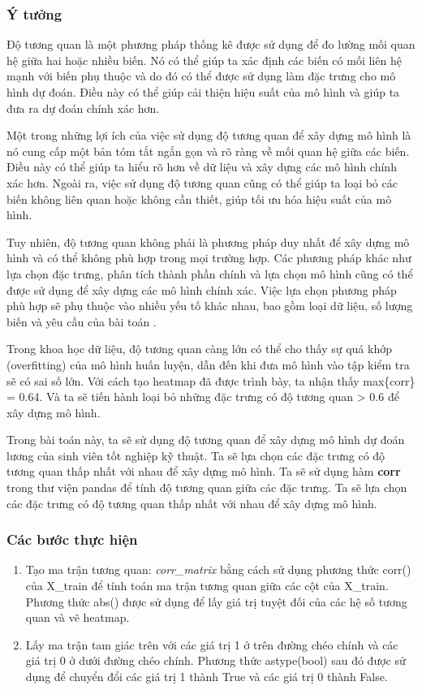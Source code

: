 \documentclass[]{article}
\begin{document}
\begin{itemize}
  \subsubsection{Ý tưởng}
  Độ tương quan là một phương pháp thống kê được sử dụng để đo lường mối quan hệ giữa hai hoặc nhiều biến. Nó có thể giúp ta xác định các biến có mối liên hệ mạnh với biến phụ thuộc và do đó có thể được sử dụng làm đặc trưng cho mô hình dự đoán. Điều này có thể giúp cải thiện hiệu suất của mô hình và giúp ta đưa ra dự đoán chính xác hơn.

  Một trong những lợi ích của việc sử dụng độ tương quan để xây dựng mô hình là nó cung cấp một bản tóm tắt ngắn gọn và rõ ràng về mối quan hệ giữa các biến. Điều này có thể giúp ta hiểu rõ hơn về dữ liệu và xây dựng các mô hình chính xác hơn. Ngoài ra, việc sử dụng độ tương quan cũng có thể giúp ta loại bỏ các biến không liên quan hoặc không cần thiết, giúp tối ưu hóa hiệu suất của mô hình.
  
  Tuy nhiên, độ tương quan không phải là phương pháp duy nhất để xây dựng mô hình và có thể không phù hợp trong mọi trường hợp. Các phương pháp khác như lựa chọn đặc trưng, phân tích thành phần chính và lựa chọn mô hình cũng có thể được sử dụng để xây dựng các mô hình chính xác. Việc lựa chọn phương pháp phù hợp sẽ phụ thuộc vào nhiều yếu tố khác nhau, bao gồm loại dữ liệu, số lượng biến và yêu cầu của bài toán \cite{hbrCorrelationMake} \cite{stackexchangeCorrelationNeeded}.

  Trong khoa học dữ liệu, độ tương quan càng lớn có thể cho thấy sự quá khớp (overfitting) của mô hình huấn luyện, dẫn đến khi đưa mô hình vào tập kiểm tra sẽ có sai số lớn. Với cách tạo heatmap đã được trình bày, ta nhận thấy max\{corr\} = 0.64. Và ta sẽ tiến hành loại bỏ những đặc trưng có độ tương quan > 0.6 để xây dựng mô hình. 

  Trong bài toán này, ta sẽ sử dụng độ tương quan để xây dựng mô hình dự đoán lương của sinh viên tốt nghiệp kỹ thuật. Ta sẽ lựa chọn các đặc trưng có độ tương quan thấp nhất với nhau để xây dựng mô hình. Ta sẽ sử dụng hàm \textbf{corr} trong thư viện pandas để tính độ tương quan giữa các đặc trưng. Ta sẽ lựa chọn các đặc trưng có độ tương quan thấp nhất với nhau để xây dựng mô hình.
  \subsubsection{Các bước thực hiện}
  \begin{enumerate}
    \item Tạo ma trận tương quan: \textit{corr\_matrix} bằng cách sử dụng phương thức corr() của X\_train để tính toán ma trận tương quan giữa các cột của X\_train. Phương thức abs() được sử dụng để lấy giá trị tuyệt đối của các hệ số tương quan và vẽ heatmap.
    \item Lấy ma trận tam giác trên với các giá trị 1 ở trên đường chéo chính và các giá trị 0 ở dưới đường chéo chính. Phương thức astype(bool) sau đó được sử dụng để chuyển đổi các giá trị 1 thành True và các giá trị 0 thành False. 
    

\end{enumerate}
\end{itemize}
\end{document}
